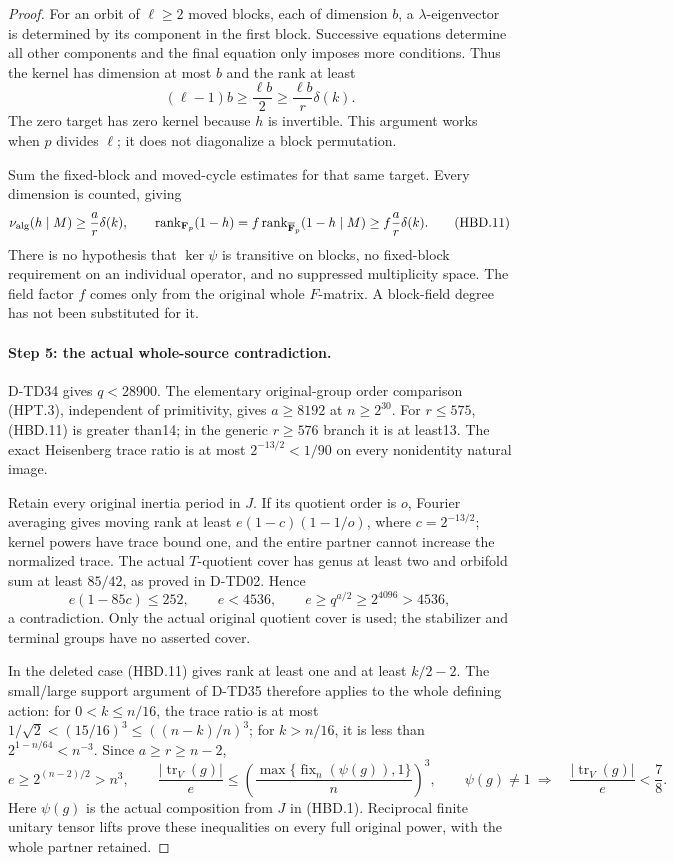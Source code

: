 \begin{proof}
For an orbit of $\ell\ge2$ moved blocks, each of dimension
$b$, a $\lambda$-eigenvector is determined by its component
in the first block.  Successive equations determine all other
components and the final equation only imposes more conditions.
Thus the kernel has dimension at most $b$ and the rank at least
\[
            (\ell-1)b\ge\frac{\ell b}{2}
                     \ge\frac{\ell b}{r}\delta(k).
 \tag{HBD.10}
\]
The zero target has zero kernel because $h$ is invertible.
This argument works when $p$ divides $\ell$; it does not
diagonalize a block permutation.

Sum the fixed-block and moved-cycle estimates for that same
target.  Every dimension is counted, giving
\[
 \nu_{\rm alg}(h\mid M)\ge\frac ar\delta(k),\qquad
 \operatorname{rank}_{\mathbf F_p}(1-h)
       =f\operatorname{rank}_{\overline{\mathbf F}_p}(1-h\mid M)
       \ge f\frac ar\delta(k).
 \tag{HBD.11}
\]
There is no hypothesis that $\ker\psi$ is transitive on
blocks, no fixed-block requirement on an individual operator,
and no suppressed multiplicity space.  The field factor $f$
comes only from the original whole $F$-matrix.  A block-field
degree has not been substituted for it.

\paragraph{Step 5: the actual whole-source contradiction.}
D-TD34 gives $q<28900$.  The elementary original-group order
comparison (HPT.3), independent of primitivity, gives $a\ge8192$
at $n\ge2^{30}$.  For $r\le575$, (HBD.11) is greater than14;
in the generic $r\ge576$ branch it is at least13.  The exact
Heisenberg trace ratio is at most $2^{-13/2}<1/90$ on every
nonidentity natural image.

Retain every original inertia period in $J$.  If its quotient
order is $o$, Fourier averaging gives moving rank at least
$e(1-c)(1-1/o)$, where $c=2^{-13/2}$; kernel powers have
trace bound one, and the entire partner cannot increase the
normalized trace.  The actual $T$-quotient cover has genus at
least two and orbifold sum at least $85/42$, as proved in
D-TD02.  Hence
\[
                 e(1-85c)\le252,\qquad e<4536,
                 \qquad e\ge q^{a/2}\ge2^{4096}>4536,
 \tag{HBD.12}
\]
a contradiction.  Only the actual original quotient cover is
used; the stabilizer and terminal groups have no asserted cover.

In the deleted case (HBD.11) gives rank at least one and
at least $k/2-2$.  The small/large support argument of D-TD35
therefore applies to the whole defining action: for
$0<k\le n/16$, the trace ratio is at most
$1/\sqrt2<(15/16)^3\le((n-k)/n)^3$; for $k>n/16$, it is
less than $2^{1-n/64}<n^{-3}$.  Since $a\ge r\ge n-2$,
\[
 e\ge2^{(n-2)/2}>n^3,\qquad
 \frac{|\operatorname{tr}_V(g)|}{e}
 \le\left(\frac{\max\{\operatorname{fix}_n(\psi(g)),1\}}n\right)^3,
 \qquad\psi(g)\ne1\ \Longrightarrow\quad
       \frac{|\operatorname{tr}_V(g)|}{e}<\frac78.
 \tag{HBD.13}
\]
Here $\psi(g)$ is the actual composition from $J$ in (HBD.1).
Reciprocal finite unitary tensor lifts prove these inequalities
on every full original power, with the whole partner retained.


\end{proof}

